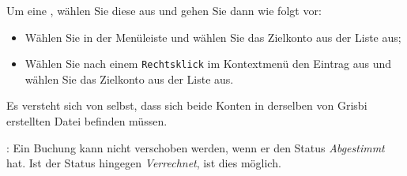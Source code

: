 Um eine , wählen Sie diese aus und gehen Sie dann wie folgt vor:
\begin{itemize}
	\item Wählen Sie in der Menüleiste  und wählen Sie das Zielkonto aus der Liste aus;
	\item Wählen Sie nach einem \texttt{Rechtsklick} im Kontextmenü den Eintrag  aus und wählen Sie das Zielkonto aus der Liste aus.
\end{itemize}

Es versteht sich von selbst, dass sich beide Konten in derselben von Grisbi erstellten Datei befinden müssen.

\Note{}: Ein Buchung kann nicht verschoben werden, wenn er den Status \emph{Abgestimmt} hat. Ist der Status hingegen \emph{Verrechnet}, ist dies möglich.


